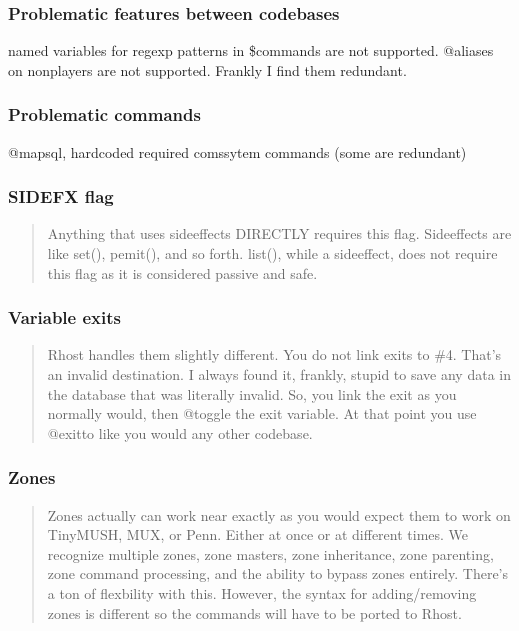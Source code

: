 \documentclass[letterpaper,10pt,english]{sphinxmanual}
\begin{document}
\subsubsection{Problematic features between codebases}
\label{\detokenize{differences:problematic-features-between-codebases}}
\sphinxAtStartPar
named variables for regexp patterns in \$commands are not supported.
@aliases on non\sphinxhyphen{}players are not supported.  Frankly I find them redundant.


\subsubsection{Problematic commands}
\label{\detokenize{differences:problematic-commands}}
\sphinxAtStartPar
@mapsql, hardcoded required comssytem commands (some are redundant)


\subsubsection{SIDEFX flag}
\label{\detokenize{differences:sidefx-flag}}\begin{quote}

\sphinxAtStartPar
Anything that uses sideeffects \textendash{}DIRECTLY\textendash{} requires this flag.
Sideeffects are like set(), pemit(), and so forth.  list(), while a
side\sphinxhyphen{}effect, does not require this flag as it is considered passive and safe.
\end{quote}


\subsubsection{Variable exits}
\label{\detokenize{differences:variable-exits}}\begin{quote}

\sphinxAtStartPar
Rhost handles them slightly different.  You do not link
exits to \#\sphinxhyphen{}4.  That’s an invalid destination.  I always found it, frankly,
stupid to save any data in the database that was literally invalid.  So,
you link the exit as you normally would, then @toggle the exit variable.
At that point you use @exitto like you would any other codebase.
\end{quote}


\subsubsection{Zones}
\label{\detokenize{differences:zones}}\begin{quote}

\sphinxAtStartPar
Zones actually can work near exactly as you would expect them to
work on TinyMUSH, MUX, or Penn.  Either at once or at different times.
We recognize multiple zones, zone masters, zone inheritance, zone
parenting, zone command processing, and the ability to bypass zones
entirely.  There’s a ton of flexbility with this.  However, the syntax
for adding/removing zones is different so the commands will have to be
ported to Rhost.
\end{quote}
\end{document}

